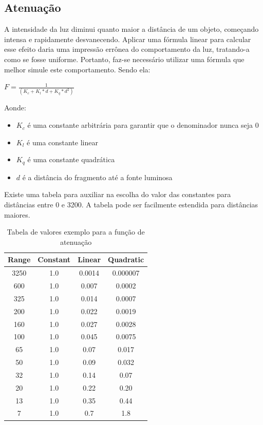 \documentclass[12pt, 
openright, 
oneside, 
a4paper,    
brazil]{facom-ufu-abntex2}
\begin{document}
\subsection{Atenuação}
A intensidade da luz diminui quanto maior a distância de um objeto, começando intensa e rapidamente desvanecendo. Aplicar uma fórmula linear para calcular esse efeito daria uma impressão errônea do comportamento da luz, tratando-a como se fosse uniforme. Portanto, faz-se necessário utilizar uma fórmula que melhor simule este comportamento. Sendo ela:

\begin{center}
$F = \frac{1} {(K_c + K_l*d + K_q*d^2)}$
\end{center}

Aonde:
\begin{itemize}
    \item $K_c$ é uma constante arbitrária para garantir que o denominador nunca seja 0
     \item $K_l$ é uma constante linear
     \item $K_q$ é uma constante quadrática
     \item $d$ é a distância do fragmento até a fonte luminosa
\end{itemize}

Existe uma tabela para auxiliar na escolha do valor das constantes para distâncias entre 0 e 3200. A tabela pode ser facilmente estendida para distâncias maiores.

\begin{table}[H]
\centering
\begin{tabular}{c c c c}
Range & Constant & Linear & Quadratic \\
\hline		
3250 & 1.0 & 0.0014 & 0.000007 \\
600 & 1.0 & 0.007 & 0.0002 \\
325 & 1.0 & 0.014 & 0.0007 \\
200 & 1.0 & 0.022 & 0.0019 \\
160 & 1.0 & 0.027 & 0.0028 \\
100 & 1.0 & 0.045 & 0.0075 \\
65 & 1.0 & 0.07 & 0.017 \\
50 & 1.0 & 0.09 & 0.032 \\
32 & 1.0 & 0.14 & 0.07 \\
20 & 1.0 & 0.22 & 0.20 \\
13 & 1.0 & 0.35 & 0.44 \\
7 & 1.0 & 0.7 & 1.8  \\

\end{tabular}
\caption{Tabela de valores exemplo para a função de atenuação}
\end{table}
\end{document}
